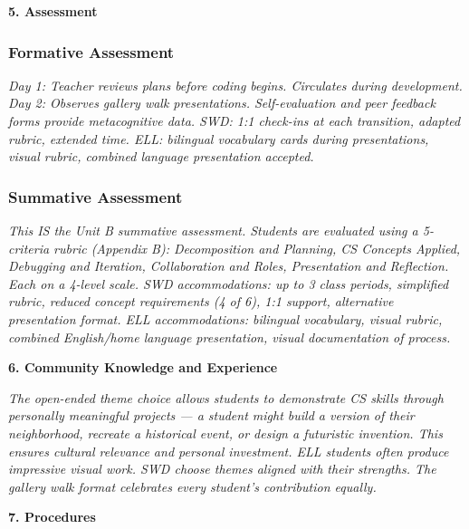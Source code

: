 \documentclass[11pt,letterpaper]{article}
\begin{document}
\newpage
\textbf{5. Assessment}

\subsubsection{Formative Assessment}

\textit{Day 1: Teacher reviews plans before coding begins. Circulates during development. Day 2: Observes gallery walk presentations. Self-evaluation and peer feedback forms provide metacognitive data. SWD: 1:1 check-ins at each transition, adapted rubric, extended time. ELL: bilingual vocabulary cards during presentations, visual rubric, combined language presentation accepted.}

\subsubsection{Summative Assessment}

\textit{This IS the Unit B summative assessment. Students are evaluated using a 5-criteria rubric (Appendix B): Decomposition and Planning, CS Concepts Applied, Debugging and Iteration, Collaboration and Roles, Presentation and Reflection. Each on a 4-level scale. SWD accommodations: up to 3 class periods, simplified rubric, reduced concept requirements (4 of 6), 1:1 support, alternative presentation format. ELL accommodations: bilingual vocabulary, visual rubric, combined English/home language presentation, visual documentation of process.}

\textbf{6. Community Knowledge and Experience}

\textit{The open-ended theme choice allows students to demonstrate CS skills through personally meaningful projects --- a student might build a version of their neighborhood, recreate a historical event, or design a futuristic invention. This ensures cultural relevance and personal investment. ELL students often produce impressive visual work. SWD choose themes aligned with their strengths. The gallery walk format celebrates every student's contribution equally.}

\textbf{7. Procedures}
\end{document}
